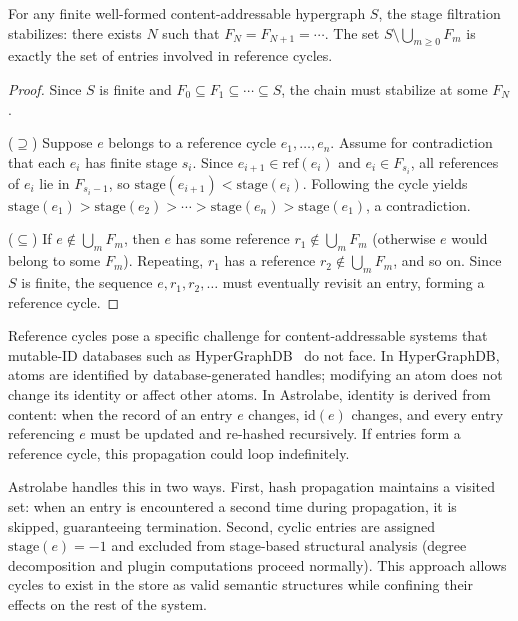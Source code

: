 \begin{proposition}
For any finite well-formed content-addressable hypergraph $S$, the stage filtration stabilizes: there exists $N$ such that $F_N = F_{N+1} = \cdots$. The set $S \setminus \bigcup_{m \geq 0} F_m$ is exactly the set of entries involved in reference cycles.
\end{proposition}

\begin{proof}
Since $S$ is finite and $F_0 \subseteq F_1 \subseteq \cdots \subseteq S$, the chain must stabilize at some $F_N$.

($\supseteq$) Suppose $e$ belongs to a reference cycle $e_1, \ldots, e_n$. Assume for contradiction that each $e_i$ has finite stage $s_i$. Since $e_{i+1} \in \mathrm{ref}(e_i)$ and $e_i \in F_{s_i}$, all references of $e_i$ lie in $F_{s_i - 1}$, so $\mathrm{stage}(e_{i+1}) < \mathrm{stage}(e_i)$. Following the cycle yields $\mathrm{stage}(e_1) > \mathrm{stage}(e_2) > \cdots > \mathrm{stage}(e_n) > \mathrm{stage}(e_1)$, a contradiction.

($\subseteq$) If $e \notin \bigcup_m F_m$, then $e$ has some reference $r_1 \notin \bigcup_m F_m$ (otherwise $e$ would belong to some $F_m$). Repeating, $r_1$ has a reference $r_2 \notin \bigcup_m F_m$, and so on. Since $S$ is finite, the sequence $e, r_1, r_2, \ldots$ must eventually revisit an entry, forming a reference cycle.
\end{proof}

Reference cycles pose a specific challenge for content-addressable systems that mutable-ID databases such as HyperGraphDB~\cite{HyperGraphDB} do not face. In HyperGraphDB, atoms are identified by database-generated handles; modifying an atom does not change its identity or affect other atoms. In Astrolabe, identity is derived from content: when the record of an entry $e$ changes, $\mathrm{id}(e)$ changes, and every entry referencing $e$ must be updated and re-hashed recursively. If entries form a reference cycle, this propagation could loop indefinitely.

Astrolabe handles this in two ways. First, hash propagation maintains a visited set: when an entry is encountered a second time during propagation, it is skipped, guaranteeing termination. Second, cyclic entries are assigned $\mathrm{stage}(e) = -1$ and excluded from stage-based structural analysis (degree decomposition and plugin computations proceed normally). This approach allows cycles to exist in the store as valid semantic structures while confining their effects on the rest of the system.
